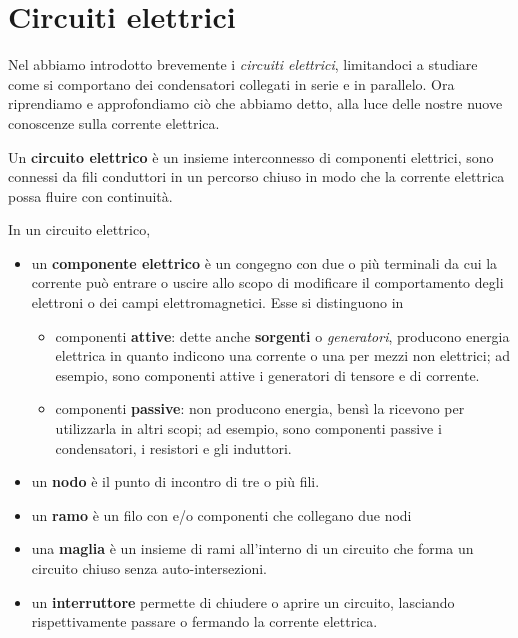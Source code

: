 \section{Circuiti elettrici}
Nel  abbiamo introdotto brevemente i \textit{circuiti elettrici}, limitandoci a studiare come si comportano dei condensatori collegati in serie e in parallelo. Ora riprendiamo e approfondiamo ciò che abbiamo detto, alla luce delle nostre nuove conoscenze sulla corrente elettrica.
\begin{define}
	Un \textbf{circuito elettrico} è un insieme interconnesso di componenti elettrici, sono connessi da fili conduttori in un percorso chiuso in modo che la corrente elettrica possa fluire con continuità.
\end{define}
\begin{define}
	In un circuito elettrico,
	\begin{itemize}
		\item un \textbf{componente elettrico} è un congegno con due o più terminali da cui la corrente può entrare o uscire allo scopo di modificare il comportamento degli elettroni o dei campi elettromagnetici. Esse si distinguono in
		\begin{itemize}
			\item componenti \textbf{attive}: dette anche \textbf{sorgenti} o \textit{generatori}, producono energia elettrica in quanto indicono una corrente o una \ddp per mezzi non elettrici; ad esempio, sono componenti attive i generatori di tensore e di corrente.
			\item componenti \textbf{passive}: non producono energia, bensì la ricevono per utilizzarla in altri scopi; ad esempio, sono componenti passive  i condensatori, i resistori e gli induttori. 
		\end{itemize}
		\item un \textbf{nodo} è il punto di incontro di tre o più fili.
		\item un \textbf{ramo} è un filo con e/o componenti che collegano due nodi 
		\item una \textbf{maglia} è un insieme di rami all'interno di un circuito che forma un circuito chiuso senza auto-intersezioni.
		\item un \textbf{interruttore} permette di chiudere o aprire un circuito, lasciando rispettivamente passare o fermando la corrente elettrica.
	\end{itemize}
\end{define}
